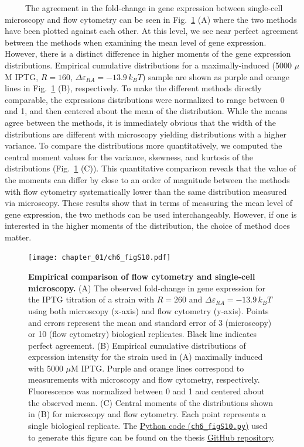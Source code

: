 \documentclass[12pt]{caltech_thesis}
\begin{document}
~~~~~The agreement in the fold-change in gene expression between
single-cell microscopy and flow cytometry can be seen in
Fig.~\ref{fig:empirical_comparison} (A) where the two methods have been
plotted against each other. At this level, we see near perfect agreement
between the methods when examining the mean level of gene expression.
However, there is a distinct difference in higher moments of the gene
expression distributions. Empirical cumulative distributions for a
maximally-induced (5000 \(\mu\)M IPTG, \(R=160\),
\(\Delta\varepsilon_{RA} = -13.9\, k_BT\)) sample are shown as purple
and orange lines in Fig.~\ref{fig:empirical_comparison} (B),
respectively. To make the different methods directly comparable, the
expressions distributions were normalized to range between 0 and 1, and
then centered about the mean of the distribution. While the means agree
between the methods, it is immediately obvious that the width of the
distributions are different with microscopy yielding distributions with
a higher variance. To compare the distributions more quantitatively, we
computed the central moment values for the variance, skewness, and
kurtosis of the distributions (Fig.~\ref{fig:empirical_comparison} (C)).
This quantitative comparison reveals that the value of the moments can
differ by close to an order of magnitude between the methods with flow
cytometry systematically lower than the same distribution measured via
microscopy. These results show that in terms of measuring the mean level
of gene expression, the two methods can be used interchangeably.
However, if one is interested in the higher moments of the distribution,
the choice of method does matter.

\hypertarget{fig:empirical_comparison}{%
\begin{figure}
\centering
\texttt{[image: chapter\_01/ch6\_figS10.pdf]}
\caption[{Empirical comparison of flow cytometry and single-cell
microscopy.}]{\textbf{Empirical comparison of flow cytometry and
single-cell microscopy.} (A) The observed fold-change in gene expression
for the IPTG titration of a strain with \(R=260\) and
\(\Delta\varepsilon_{RA} = -13.9\, k_BT\) using both microscopy (x-axis)
and flow cytometry (y-axis). Points and errors represent the mean and
standard error of 3 (microscopy) or 10 (flow cytometry) biological
replicates. Black line indicates perfect agreement. (B) Empirical
cumulative distributions of expression intensity for the strain used in
(A) maximally induced with 5000 \(\mu\)M IPTG. Purple and orange lines
correspond to measurements with microscopy and flow cytometry,
respectively. Fluorescence was normalized between 0 and 1 and centered
about the observed mean. (C) Central moments of the distributions shown
in (B) for microscopy and flow cytometry. Each point represents a single
biological replicate. The
\href{https://github.com/gchure/phd/blob/master/src/chapter_06/code/ch6_figS10.py}{Python
code (\texttt{ch6\_figS10.py})} used to generate this figure can be
found on the thesis \href{https://github.com/gchure/phd}{GitHub
repository}.}
\label{fig:empirical_comparison}
\end{figure}
}
\end{document}
